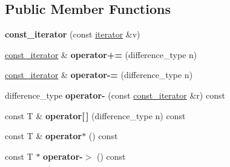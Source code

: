 \subsection*{Public Member Functions}
\begin{DoxyCompactItemize}
\item 
\hypertarget{classcircularDeque_1_1const__iterator_a53e008033bdfbae4dd83c5e9de26652b}{{\bfseries const\+\_\+iterator} (const \hyperlink{classcircularDeque_1_1iterator}{iterator} \&v)}\label{classcircularDeque_1_1const__iterator_a53e008033bdfbae4dd83c5e9de26652b}

\item 
\hypertarget{classcircularDeque_1_1const__iterator_aaa9b3f1937d17f6f12f9986c477f89f5}{\hyperlink{classcircularDeque_1_1const__iterator}{const\+\_\+iterator} \& {\bfseries operator+=} (difference\+\_\+type n)}\label{classcircularDeque_1_1const__iterator_aaa9b3f1937d17f6f12f9986c477f89f5}

\item 
\hypertarget{classcircularDeque_1_1const__iterator_a4e4380fcc95e65534c39c83b93f708f8}{\hyperlink{classcircularDeque_1_1const__iterator}{const\+\_\+iterator} \& {\bfseries operator-\/=} (difference\+\_\+type n)}\label{classcircularDeque_1_1const__iterator_a4e4380fcc95e65534c39c83b93f708f8}

\item 
\hypertarget{classcircularDeque_1_1const__iterator_a3b2d9d2083342f3b378e87ea8fb271f3}{difference\+\_\+type {\bfseries operator-\/} (const \hyperlink{classcircularDeque_1_1const__iterator}{const\+\_\+iterator} \&r) const }\label{classcircularDeque_1_1const__iterator_a3b2d9d2083342f3b378e87ea8fb271f3}

\item 
\hypertarget{classcircularDeque_1_1const__iterator_a0c30a5251f3b952fc2438e3f01c4294f}{const T \& {\bfseries operator\mbox{[}$\,$\mbox{]}} (difference\+\_\+type n) const }\label{classcircularDeque_1_1const__iterator_a0c30a5251f3b952fc2438e3f01c4294f}

\item 
\hypertarget{classcircularDeque_1_1const__iterator_af221298ee852c28ba884b18bd564c381}{const T \& {\bfseries operator$\ast$} () const }\label{classcircularDeque_1_1const__iterator_af221298ee852c28ba884b18bd564c381}

\item 
\hypertarget{classcircularDeque_1_1const__iterator_a99a687821e6b8356695374eb60a17644}{const T $\ast$ {\bfseries operator-\/$>$} () const }\label{classcircularDeque_1_1const__iterator_a99a687821e6b8356695374eb60a17644}


\end{DoxyCompactItemize}
